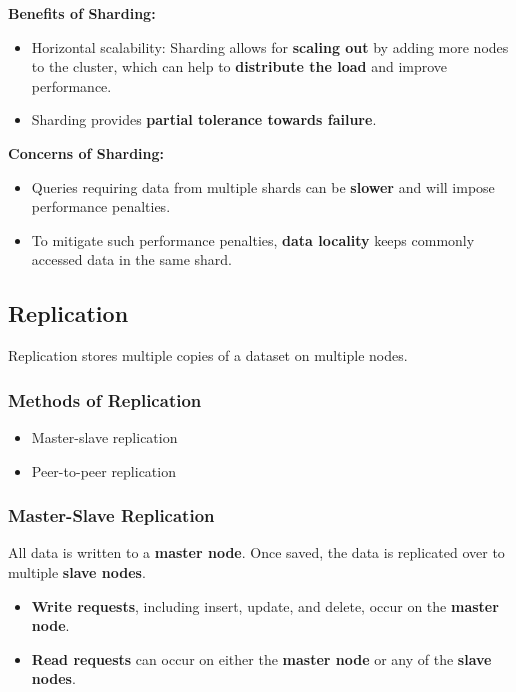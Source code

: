 \documentclass[12pt,a4paper]{report}
\begin{document}
\begin{keyconcept}
\textbf{Benefits of Sharding:}
\begin{itemize}
  \item Horizontal scalability: Sharding allows for \textbf{scaling out} by adding more nodes to the cluster, which can help to \textbf{distribute the load} and improve performance.
  \item Sharding provides \textbf{partial tolerance towards failure}.
\end{itemize}
\end{keyconcept}

\begin{important}
\textbf{Concerns of Sharding:}
\begin{itemize}
  \item Queries requiring data from multiple shards can be \textbf{slower} and will impose performance penalties.
  \item To mitigate such performance penalties, \textbf{data locality} keeps commonly accessed data in the same shard.
\end{itemize}
\end{important}

\subsection{Replication}
Replication stores multiple copies of a dataset on multiple nodes.

\subsubsection{Methods of Replication}
\begin{itemize}
  \item Master-slave replication
  \item Peer-to-peer replication
\end{itemize}

\subsubsection{Master-Slave Replication}
All data is written to a \textbf{master node}. Once saved, the data is replicated over to multiple \textbf{slave nodes}.
\begin{itemize}
  \item \textbf{Write requests}, including insert, update, and delete, occur on the \textbf{master node}.
  \item \textbf{Read requests} can occur on either the \textbf{master node} or any of the \textbf{slave nodes}.
\end{itemize}
\end{document}
